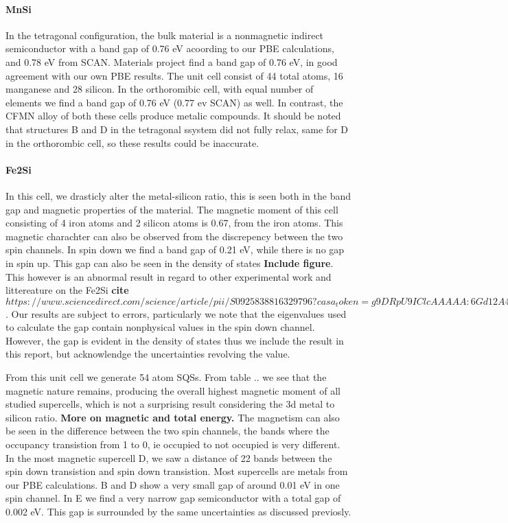 \paragraph{MnSi \\}
In the tetragonal configuration, the bulk material is a nonmagnetic indirect semiconductor with a band gap of 0.76 eV acoording to our PBE calculations,  and 0.78 eV from SCAN. Materials project find a band gap of 0.76 eV, in good agreement with our own PBE results. The unit cell consist of 44 total atoms, 16 manganese and 28 silicon. In the orthoromibic cell, with equal number of elements we find a band gap of 0.76 eV (0.77 ev SCAN) as well. In contrast, the CFMN alloy of both these cells produce metalic compounds. It should be noted that structures B and D in the tetragonal ssystem did not fully relax, same for D in the orthorombic cell, so these results could be inaccurate.   

\paragraph{Fe2Si \\}
In this cell, we drasticly alter the metal-silicon ratio, this is seen both in the band gap and magnetic properties of the material. The magnetic moment of this cell consisting of 4 iron atoms and 2 silicon atoms is 0.67, from the iron atoms. This magnetic charachter can also be observed from the discrepency between the two spin channels. In spin down we find a band gap of 0.21 eV, while there is no gap in spin up. This gap can also be seen in the density of states \textbf{Include figure}. This however is an abnormal result in regard to other experimental work and littereature on the Fe2Si \textbf{cite $https://www.sciencedirect.com/science/article/pii/S0925838816329796?casa_token=g9DRpU9IClcAAAAA:6Gd12A4Kh9J2igUWMVwHN8OSIKzD27VACA052FNsSAWhRY6PELWdVEPbiF8OtQ3eJEAbvQ8X0g$}. Our results are subject to errors, particularly we note that the eigenvalues used to calculate the gap contain nonphysical values in the spin down channel. However, the gap is evident in the density of states thus we include the result in this report, but acknowlendge the uncertainties revolving the value. 

From this unit cell we generate 54 atom SQSs. From table .. we see that the magnetic nature remains, producing the overall highest magnetic moment of all studied supercells, which is not a surprising result considering the 3d metal to silicon ratio. \textbf{More on magnetic and total energy.} The magnetism can also be seen in the difference between the two spin channels, the bands where the occupancy transistion from 1 to 0, ie occupied to not occupied is very different. In the most magnetic supercell D, we saw a distance of 22 bands between the spin down transistion and spin down transistion. Most supercells are metals from our PBE calculations. B and D show a very small gap of around 0.01 eV in one spin channel.  In E we find a very narrow gap semiconductor with a total gap of 0.002 eV. This gap is surrounded by the same uncertainties as discussed previosly.
